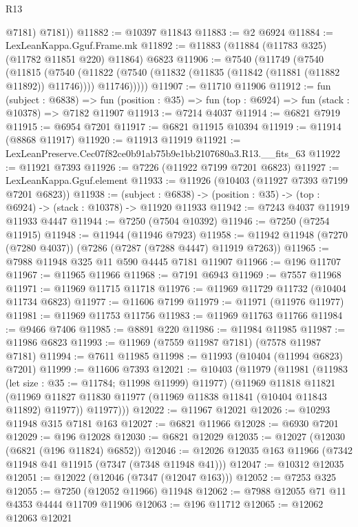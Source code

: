 \begin{lexlean}{R13}
\begin{coremodule}
          @7181)
        @7181))
@11882 := @10397 @11843
@11883 := @2 @6924
@11884 := LexLeanKappa.Gguf.Frame.mk
@11892 := @11883 (@11884 (@11783 @325) (@11782 @11851 @220) @11864) @6823
@11906 := @7540
    (@11749
      (@7540
        (@11815
          (@7540
            (@11822 (@7540 (@11832 (@11835 (@11842 (@11881 (@11882 @11892)) @11746)))) @11746)))))
@11907 := @11710 @11906
@11912 := fun (subject : @6838) =>
  fun (position : @35) => fun (top : @6924) => fun (stack : @10378) => @7182 @11907
@11913 := @7214 @4037
@11914 := @6821 @7919
@11915 := @6954 @7201
@11917 := @6821 @11915 @10394
@11919 := @11914 (@8868 @11917)
@11920 := @11913 @11919
@11921 := LexLeanPreserve.Cec07f82ce0b91ab75b9e1bb2107680a3.R13.__fits_63
@11922 := @11921 @7393
@11926 := @7226 (@11922 @7199 @7201 @6823)
@11927 := LexLeanKappa.Gguf.element
@11933 := @11926 (@10403 (@11927 @7393 @7199 @7201 @6823))
@11938 := (subject : @6838) ->
  (position : @35) -> (top : @6924) -> (stack : @10378) -> @11920 @11933
@11942 := @7243 @4037 @11919 @11933 @4447
@11944 := @7250 (@7504 @10392)
@11946 := @7250 (@7254 @11915)
@11948 := @11944 (@11946 @7923)
@11958 := @11942 @11948 (@7270 (@7280 @4037)) (@7286 (@7287 (@7288 @4447) @11919 @7263))
@11965 := @7988 @11948 @325 @11 @590 @4445 @7181 @11907
@11966 := @196 @11707
@11967 := @11965 @11966
@11968 := @7191 @6943
@11969 := @7557 @11968
@11971 := @11969 @11715 @11718
@11976 := @11969 @11729 @11732 (@10404 @11734 @6823)
@11977 := @11606 @7199
@11979 := @11971 (@11976 @11977)
@11981 := @11969 @11753 @11756
@11983 := @11969 @11763 @11766
@11984 := @9466 @7406
@11985 := @8891 @220
@11986 := @11984 @11985
@11987 := @11986 @6823
@11993 := @11969 (@7559 @11987 @7181) (@7578 @11987 @7181)
@11994 := @7611 @11985
@11998 := @11993 (@10404 (@11994 @6823) @7201)
@11999 := @11606 @7393
@12021 := @10403
    (@11979
      (@11981
        (@11983 (let size : @35 := @11784; @11998 @11999) @11977)
        (@11969
          @11818
          @11821
          (@11969 @11827 @11830 @11977 (@11969 @11838 @11841 (@10404 @11843 @11892) @11977))
          @11977)))
@12022 := @11967 @12021
@12026 := @10293 @11948 @315 @7181 @163
@12027 := @6821 @11966
@12028 := @6930 @7201
@12029 := @196 @12028
@12030 := @6821 @12029
@12035 := @12027 (@12030 (@6821 (@196 @11824) @6852))
@12046 := @12026 @12035 @163 @11966 (@7342 @11948 @41 @11915 (@7347 (@7348 @11948 @41)))
@12047 := @10312 @12035
@12051 := @12022 (@12046 (@7347 (@12047 @163)))
@12052 := @7253 @325
@12055 := @7250 (@12052 @11966) @11948
@12062 := @7988 @12055 @71 @11 @4353 @4444 @11709 @11906
@12063 := @196 @11712
@12065 := @12062 @12063 @12021

\end{coremodule}
\end{lexlean}
